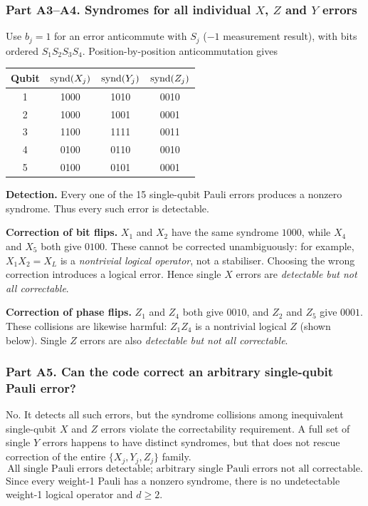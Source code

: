 \subsubsection*{Part A3--A4. Syndromes for all individual $X$, $Z$ and $Y$ errors}
Use $b_j=1$ for an error anticommute with $S_j$ ($-1$ measurement result), with bits ordered $S_1S_2S_3S_4$. Position-by-position anticommutation gives
\begin{center}\small
\begin{tabular}{@{}cccc@{}}\toprule Qubit&$\operatorname{synd}(X_j)$&$\operatorname{synd}(Y_j)$&$\operatorname{synd}(Z_j)$\\\midrule
1&1000&1010&0010\\
2&1000&1001&0001\\
3&1100&1111&0011\\
4&0100&0110&0010\\
5&0100&0101&0001\\\bottomrule
\end{tabular}\end{center}
\textbf{Detection.} Every one of the 15 single-qubit Pauli errors produces a nonzero syndrome. Thus every such error is detectable.

\textbf{Correction of bit flips.} $X_1$ and $X_2$ have the same syndrome $1000$, while $X_4$ and $X_5$ both give $0100$. These cannot be corrected unambiguously: for example, $X_1X_2=X_L$ is a \emph{nontrivial logical operator}, not a stabiliser. Choosing the wrong correction introduces a logical error. Hence single $X$ errors are \emph{detectable but not all correctable}.

\textbf{Correction of phase flips.} $Z_1$ and $Z_4$ both give $0010$, and $Z_2$ and $Z_5$ give $0001$. These collisions are likewise harmful: $Z_1Z_4$ is a nontrivial logical $Z$ (shown below). Single $Z$ errors are also \emph{detectable but not all correctable}.

\subsubsection*{Part A5. Can the code correct an arbitrary single-qubit Pauli error?}
No. It detects all such errors, but the syndrome collisions among inequivalent single-qubit $X$ and $Z$ errors violate the correctability requirement. A full set of single $Y$ errors happens to have distinct syndromes, but that does not rescue correction of the entire $\{X_j,Y_j,Z_j\}$ family.
\begin{equation}\boxed{\text{All single Pauli errors detectable; arbitrary single Pauli errors not all correctable.}}\end{equation}
Since every weight-1 Pauli has a nonzero syndrome, there is no undetectable weight-1 logical operator and $d\ge2$.

